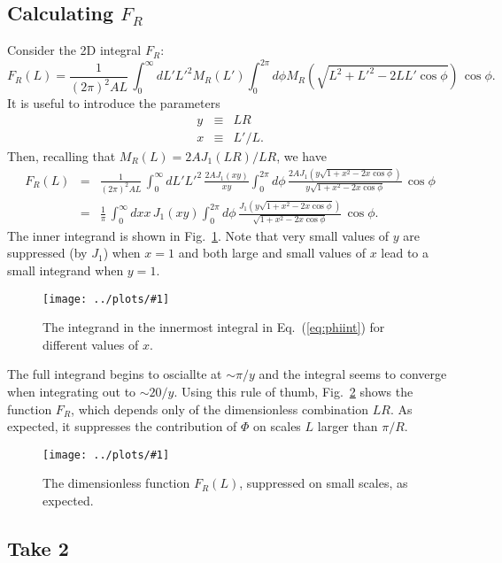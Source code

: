 \documentclass[prd,amsmath,amssymb,floatfix,superscriptaddress,nofootinbib]{revtex4-1}
\def\be{\begin{equation}}
\def\ee{\end{equation}}
\def\bea{\begin{eqnarray}}
\def\eea{\end{eqnarray}}
\newcommand{\vs}{\nonumber\\}
\newcommand{\ec}[1]{Eq.~(\ref{eq:#1})}
\newcommand{\eql}[1]{\label{eq:#1}}
\newcommand{\rf}[1]{\ref{fig:#1}}
\newcommand{\sfigg}[2]{
\texttt{[image: ../plots/\#1]}
        }
\newcommand{\Spng}[2]{
   \begin{figure}[thbp]
   \begin{center}
    \sfigg{../plots/#1.png}{.7\columnwidth}
    \caption{{\small #2}}
    \label{fig:#1}
     \end{center}
   \end{figure}
}
\begin{document}
\subsection{Calculating $F_R$}
Consider the 2D integral $F_R$:
\be
 F_R(L) = \frac1{(2\pi)^2AL}\, \int_0^\infty dL' L'^2 M_R(L')  \int_0^{2\pi} d\phi M_R\left(\sqrt{L^2+L'^2-2LL'\cos\phi}\right)  \,\cos\phi.\ee
 It is useful to introduce the parameters
 \bea
 y &\equiv& LR\vs
 x &\equiv& L'/L.\eea
 Then, recalling that $M_R(L) = 2A J_1(LR)/LR$, we have
 \bea
 F_R(L) &=& \frac1{(2\pi)^2AL}\, \int_0^\infty dL' L'^2 \, \frac{2AJ_1(xy)}{xy} \int_0^{2\pi} d\phi \,\frac{2A J_1(y\sqrt{1+x^2-2x\cos\phi})}{y\sqrt{1+x^2-2x\cos\phi}}
 \,\cos\phi
 \vs
 &=&\frac{1}{\pi}\, \int_0^\infty dx x \, {J_1(xy)}\int_0^{2\pi} d\phi \,\frac{J_1(y\sqrt{1+x^2-2x\cos\phi})}{\sqrt{1+x^2-2x\cos\phi}}
 \,\cos\phi.\eql{phiint}
 \eea
 The inner integrand is shown in Fig.~\rf{phiinty}. Note that very small values of $y$ are suppressed (by $J_1$) when $x=1$ and both large and small values of $x$ lead to a small integrand when $y=1$. %
 \Spng{phiinty}{The integrand in the innermost integral in \ec{phiint} for different values of $x$.}
 The full integrand begins to osciallte at $\sim\pi/y$ and the integral seems to converge when integrating out to $\sim20/y$. Using this rule of thumb, Fig.~\rf{mr} shows the function $F_R$, 
 which depends only of the dimensionless combination $LR$. As expected, it suppresses the contribution of $\Phi$ on scales $L$ larger than $\pi/R$.
 \Spng{mr}{The dimensionless function $F_R(L)$, suppressed on small scales, as expected.}

\subsection{Take 2}
\end{document}
